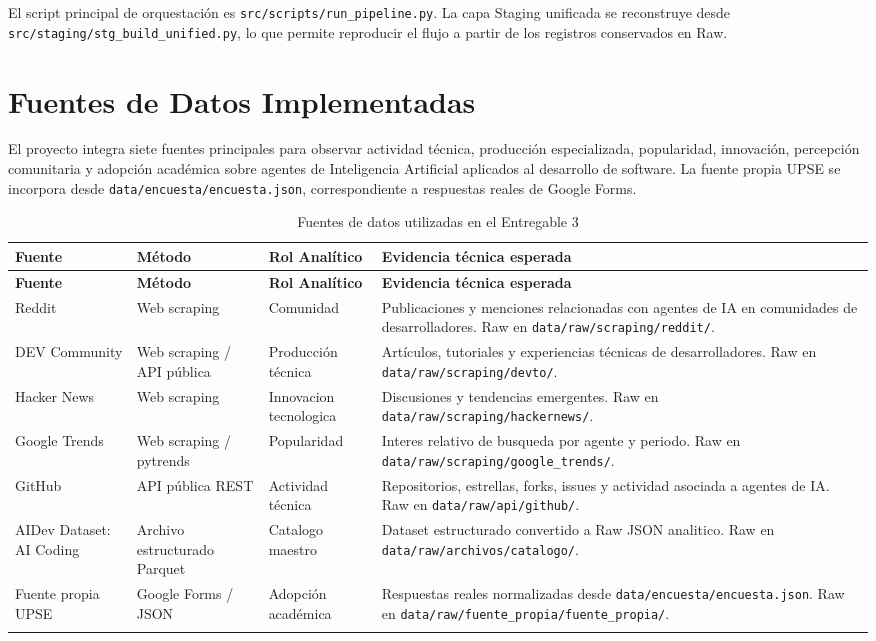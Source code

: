 \documentclass[12pt,a4paper]{article}
\newcommand{\pathcode}[1]{\begingroup\footnotesize\ttfamily\nolinkurl{#1}\endgroup}
\begin{document}
El script principal de orquestaci\'on es \pathcode{src/scripts/run_pipeline.py}. La capa Staging unificada se reconstruye desde \pathcode{src/staging/stg_build_unified.py}, lo que permite reproducir el flujo a partir de los registros conservados en Raw.

\section{Fuentes de Datos Implementadas}

El proyecto integra siete fuentes principales para observar actividad t\'ecnica, producci\'on especializada, popularidad, innovaci\'on, percepci\'on comunitaria y adopci\'on acad\'emica sobre agentes de Inteligencia Artificial aplicados al desarrollo de software. La fuente propia UPSE se incorpora desde \pathcode{data/encuesta/encuesta.json}, correspondiente a respuestas reales de Google Forms.

\scriptsize
\begin{longtable}{|P{2.4cm}|P{2.2cm}|P{2.4cm}|P{6.1cm}|}
\hline
{}
\textbf{Fuente} & \textbf{M\'etodo} & \textbf{Rol Anal\'itico} & \textbf{Evidencia t\'ecnica esperada} \\ \hline
\endfirsthead
\hline
{}
\textbf{Fuente} & \textbf{M\'etodo} & \textbf{Rol Anal\'itico} & \textbf{Evidencia t\'ecnica esperada} \\ \hline
\endhead
Reddit & Web scraping & Comunidad & Publicaciones y menciones relacionadas con agentes de IA en comunidades de desarrolladores. Raw en \pathcode{data/raw/scraping/reddit/}. \\ \hline
DEV Community & Web scraping / API p\'ublica & Producci\'on t\'ecnica & Art\'iculos, tutoriales y experiencias t\'ecnicas de desarrolladores. Raw en \pathcode{data/raw/scraping/devto/}. \\ \hline
Hacker News & Web scraping & Innovacion tecnologica & Discusiones y tendencias emergentes. Raw en \pathcode{data/raw/scraping/hackernews/}. \\ \hline
Google Trends & Web scraping / pytrends & Popularidad & Interes relativo de busqueda por agente y periodo. Raw en \pathcode{data/raw/scraping/google_trends/}. \\ \hline
GitHub & API p\'ublica REST & Actividad t\'ecnica & Repositorios, estrellas, forks, issues y actividad asociada a agentes de IA. Raw en \pathcode{data/raw/api/github/}. \\ \hline
AIDev Dataset: AI Coding & Archivo estructurado Parquet & Catalogo maestro & Dataset estructurado convertido a Raw JSON analitico. Raw en \pathcode{data/raw/archivos/catalogo/}. \\ \hline
Fuente propia UPSE & Google Forms / JSON & Adopci\'on acad\'emica & Respuestas reales normalizadas desde \pathcode{data/encuesta/encuesta.json}. Raw en \pathcode{data/raw/fuente_propia/fuente_propia/}. \\ \hline
\caption{Fuentes de datos utilizadas en el Entregable 3}
\end{longtable}
\normalsize
\end{document}
